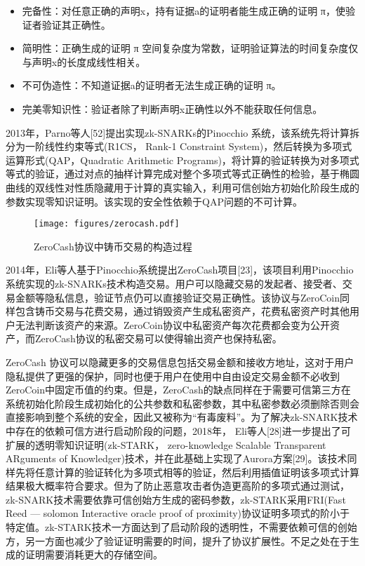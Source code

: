 \begin{itemize}
	\item 完备性：对任意正确的声明x，持有证据a的证明者能生成正确的证明 π，使验证者验证其正确性。
	\item 简明性：正确生成的证明 π 空间复杂度为常数，证明验证算法的时间复杂度仅与声明x的长度成线性相关。
	\item 不可伪造性：不知道证据a的证明者无法生成正确的证明 π。
	\item 完美零知识性：验证者除了判断声明x正确性以外不能获取任何信息。
\end{itemize}

2013年，Parno等人[52]提出实现zk-SNARKs的Pinocchio 系统，该系统先将计算拆分为一阶线性约束等式(R1CS， Rank-1 Constraint System)，然后转换为多项式运算形式(QAP，Quadratic Arithmetic Programs)，将计算的验证转换为对多项式等式的验证，通过对点的抽样计算完成对整个多项式等式正确性的检验，基于椭圆曲线的双线性对性质隐藏用于计算的真实输入，利用可信创始方初始化阶段生成的参数实现零知识证明。该实现的安全性依赖于QAP问题的不可计算。

\begin{figure}
\centering
\texttt{[image: figures/zerocash.pdf]}
\caption{ZeroCash协议中铸币交易的构造过程}
\label{fig:zerocash}
\end{figure}

2014年，Eli等人基于Pinocchio系统提出ZeroCash项目[23]，该项目利用Pinocchio系统实现的zk-SNARKs技术构造交易。用户可以隐藏交易的发起者、接受者、交易金额等隐私信息，验证节点仍可以直接验证交易正确性。该协议与ZeroCoin同样包含铸币交易与花费交易，通过销毁资产生成私密资产，花费私密资产时其他用户无法判断该资产的来源。ZeroCoin协议中私密资产每次花费都会变为公开资产，而ZeroCash协议的私密交易可以使得输出资产也保持私密。

ZeroCash 协议可以隐藏更多的交易信息包括交易金额和接收方地址，这对于用户隐私提供了更强的保护，同时也便于用户在使用中自由设定交易金额不必收到ZeroCoin中固定币值的约束。但是，ZeroCash的缺点同样在于需要可信第三方在系统初始化阶段生成初始化的公共参数和私密参数，其中私密参数必须删除否则会直接影响到整个系统的安全，因此又被称为“有毒废料”。为了解决zk-SNARK技术中存在的依赖可信方进行启动阶段的问题，2018年， Eli等人[28]进一步提出了可扩展的透明零知识证明(zk-STARK， zero-knowledge Scalable Transparent ARguments of Knowledger)技术，并在此基础上实现了Aurora方案[29]。该技术同样先将任意计算的验证转化为多项式相等的验证，然后利用插值证明该多项式计算结果极大概率符合要求。但为了防止恶意攻击者伪造更高阶的多项式通过测试，zk-SNARK技术需要依靠可信创始方生成的密码参数，zk-STARK采用FRI(Fast Reed — solomon Interactive oracle proof of proximity)协议证明多项式的阶小于特定值。zk-STARK技术一方面达到了启动阶段的透明性，不需要依赖可信的创始方，另一方面也减少了验证证明需要的时间，提升了协议扩展性。不足之处在于生成的证明需要消耗更大的存储空间。

